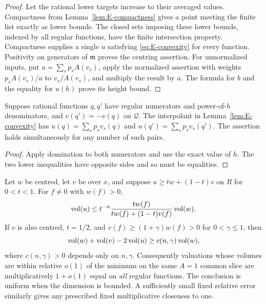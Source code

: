 \begin{proof}
Let the rational lower targets increase to their averaged values.
Compactness from Lemma~\ref{lem:E-compactness} gives a point meeting
the finite list exactly as lower bounds. The closed sets imposing
these lower bounds, indexed by all regular functions, have the finite
intersection property. Compactness supplies a single $u$ satisfying
\eqref{eq:E-convexity} for every function. Positivity on generators of
$\mathfrak m$ proves the centring assertion. For unnormalized inputs,
put $a=\sum_s p_sA(v_s)$, apply the normalized assertion with weights
$p_sA(v_s)/a$ to $v_s/A(v_s)$, and multiply the result by $a$.
The formula for $b$ and the equality for $u(h)$ prove its height bound.
\end{proof}

\begin{corollary}\label{cor:E-opposite-ratios}
Suppose rational functions $q,q'$ have regular numerators and
power-of-$h$ denominators, and $v(q')=-v(q)$ on $\mathcal Q$.
The interpolant in Lemma~\ref{lem:E-convexity} has
$u(q)=\sum_s p_sv_s(q)$ and $u(q')=\sum_s p_sv_s(q')$.
The assertion holds simultaneously for any number of such pairs.
\end{corollary}
\begin{proof}
Apply domination to both numerators and use the exact value of $h$.
The two lower inequalities have opposite sides and so must be equalities.
\end{proof}

\begin{lemma}
\label{lem:E-volume-interpolation}
Let $w$ be centred, let $v$ be over $x$, and suppose
$u\ge tw+(1-t)v$ on $R$ for $0<t<1$. For $f\ne0$ with $w(f)>0$,
\begin{equation}\label{eq:E-volume-interpolation}
 \operatorname{vol}(u)\le t^{-n}
   \frac{tw(f)}{tw(f)+(1-t)v(f)}\operatorname{vol}(w).
\end{equation}
If $v$ is also centred, $t=1/2$, and
$v(f)\ge(1+\gamma)w(f)>0$ for $0<\gamma\le1$, then
\begin{equation}\label{eq:E-volume-gap}
 \operatorname{vol}(w)+\operatorname{vol}(v)-2\operatorname{vol}(u)\ge c(n,\gamma)\operatorname{vol}(w),
\end{equation}
where $c(n,\gamma)>0$ depends only on $n,\gamma$.
Consequently valuations whose volumes are within relative $o(1)$ of
the minimum on the same $A=1$ common slice are multiplicatively
$1+o(1)$ equal on \emph{all} regular functions. The conclusion is
uniform when the dimension is bounded. A sufficiently small fixed
relative error similarly gives any prescribed fixed multiplicative
closeness to one.
\end{lemma}

